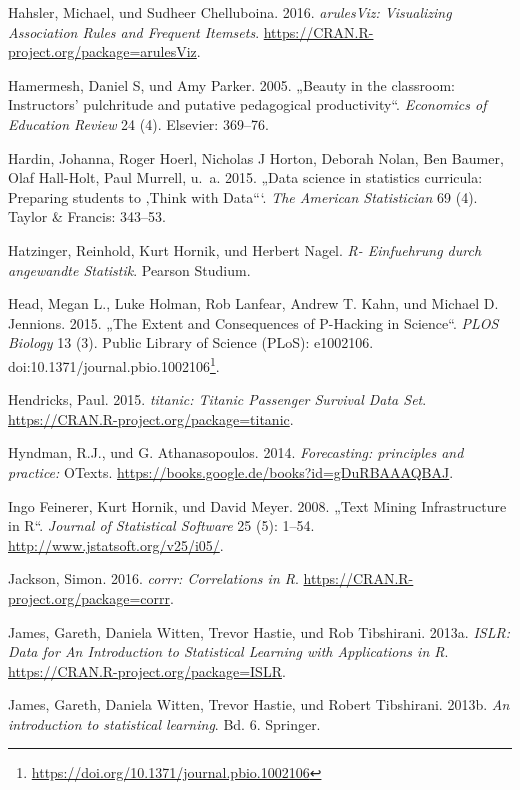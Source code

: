 \documentclass[12pt,ngerman,]{book}
\let\rmarkdownfootnote\footnote%
\def\footnote{\protect\rmarkdownfootnote}
\renewcommand{\href}[2]{#2\footnote{\url{#1}}}
\begin{document}
\hypertarget{ref-R-arulesViz}{}
Hahsler, Michael, und Sudheer Chelluboina. 2016. \emph{arulesViz:
Visualizing Association Rules and Frequent Itemsets}.
\url{https://CRAN.R-project.org/package=arulesViz}.

\hypertarget{ref-hamermesh2005beauty}{}
Hamermesh, Daniel S, und Amy Parker. 2005. „Beauty in the classroom:
Instructors' pulchritude and putative pedagogical productivity``.
\emph{Economics of Education Review} 24 (4). Elsevier: 369--76.

\hypertarget{ref-hardin2015data}{}
Hardin, Johanna, Roger Hoerl, Nicholas J Horton, Deborah Nolan, Ben
Baumer, Olaf Hall-Holt, Paul Murrell, u.~a. 2015. „Data science in
statistics curricula: Preparing students to ‚Think with Data```.
\emph{The American Statistician} 69 (4). Taylor \& Francis: 343--53.

\hypertarget{ref-Hatzinger}{}
Hatzinger, Reinhold, Kurt Hornik, und Herbert Nagel. \emph{R-
Einfuehrung durch angewandte Statistik}. Pearson Studium.

\hypertarget{ref-Head2015}{}
Head, Megan L., Luke Holman, Rob Lanfear, Andrew T. Kahn, und Michael D.
Jennions. 2015. „The Extent and Consequences of P-Hacking in Science``.
\emph{PLOS Biology} 13 (3). Public Library of Science (PLoS): e1002106.
doi:\href{https://doi.org/10.1371/journal.pbio.1002106}{10.1371/journal.pbio.1002106}.

\hypertarget{ref-R-titanic}{}
Hendricks, Paul. 2015. \emph{titanic: Titanic Passenger Survival Data
Set}. \url{https://CRAN.R-project.org/package=titanic}.

\hypertarget{ref-hyndman2014forecasting}{}
Hyndman, R.J., und G. Athanasopoulos. 2014. \emph{Forecasting:
principles and practice:} OTexts.
\url{https://books.google.de/books?id=gDuRBAAAQBAJ}.

\hypertarget{ref-tm}{}
Ingo Feinerer, Kurt Hornik, und David Meyer. 2008. „Text Mining
Infrastructure in R``. \emph{Journal of Statistical Software} 25 (5):
1--54. \url{http://www.jstatsoft.org/v25/i05/}.

\hypertarget{ref-R-corrr}{}
Jackson, Simon. 2016. \emph{corrr: Correlations in R}.
\url{https://CRAN.R-project.org/package=corrr}.

\hypertarget{ref-R-ISLR}{}
James, Gareth, Daniela Witten, Trevor Hastie, und Rob Tibshirani. 2013a.
\emph{ISLR: Data for An Introduction to Statistical Learning with
Applications in R}. \url{https://CRAN.R-project.org/package=ISLR}.

\hypertarget{ref-introstatlearning}{}
James, Gareth, Daniela Witten, Trevor Hastie, und Robert Tibshirani.
2013b. \emph{An introduction to statistical learning}. Bd. 6. Springer.
\end{document}
